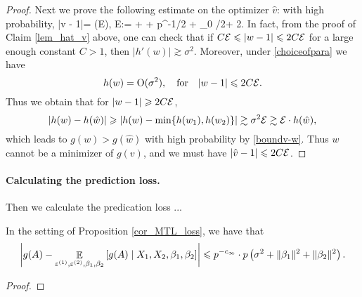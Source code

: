 \begin{proof}
Next we prove the following estimate on the optimizer $\hat v$: with high probability,
\be\label{hatv_add1}
|\hat v - 1|= \OO\left(\cal E\right), \quad \cal E:= +  + p^{-1/2 + \e_0 /2+ 2\e}.
\ee
 In fact, from the proof of Claim \ref{lem_hat_v} above, one can check that if $C\cal E \le |w-1| \le 2C\cal E$ for a large enough constant $C>1$, then $|h'(w)|\gtrsim \sigma^2$. Moreover, under \eqref{choiceofpara} we have
$$h(w) =\OO(\sigma^2),\quad \text{for}\quad   |w-1|\le 2C\cal E.$$
Thus we obtain that for $|w-1|\ge 2C\cal E$,
$$\left|h(w) - h(\hat w)\right|\ge |h(w)-\min\{h(w_1),h(w_2)\}|\gtrsim \sigma^2 \cal E \gtrsim \cal E \cdot h(\hat w),$$
which leads to $g(w) > g(\hat w)$ with high probability by \eqref{boundv-w}. Thus $w$ cannot be a minimizer of $g(v)$, and we must have $|\hat v - 1|\le 2C\cal E$. %
\end{proof}

\paragraph{Calculating the prediction loss.} Then we calculate the predication loss ...


 \begin{claim}\label{claim_largedev2}
 In the setting of Proposition \ref{cor_MTL_loss}, we have that 
$$\left| g(A) - \exarg{\epsilon^{(1)}, \epsilon^{(2)},\beta_1,\beta_2}{g(A) \mid X_1, X_2 ,\beta_1,\beta_2}\right| \le p^{-c_\infty}\cdot p\left(\sigma^2 +\|\beta_1\|^2 +\|\beta_2\|^2 \right). $$
 \end{claim}
 \begin{proof}
 \end{proof}
 
